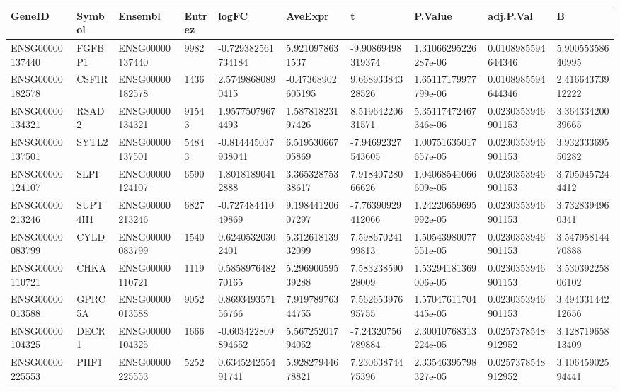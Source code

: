 \begingroup
\tiny
\setlength{\tabcolsep}{2pt}
\renewcommand{\arraystretch}{1.18}
\begin{tabular}{@{}llllllllll@{}}
\toprule
GeneID & Symbol & Ensembl & Entrez & logFC & AveExpr & t & P.Value & adj.P.Val & B \\
\midrule
ENSG00000137440 & FGFBP1 & ENSG00000137440 & 9982 & -0.729382561734184 & 5.9210978631537 & -9.90869498319374 & 1.31066295226287e-06 & 0.0108985594644346 & 5.90055358640995 \\
ENSG00000182578 & CSF1R & ENSG00000182578 & 1436 & 2.57498680890415 & -0.47368902605195 & 9.66893384328526 & 1.65117179977799e-06 & 0.0108985594644346 & 2.41664373912222 \\
ENSG00000134321 & RSAD2 & ENSG00000134321 & 91543 & 1.95775079674493 & 1.58781823197426 & 8.51964220631571 & 5.35117472467346e-06 & 0.0230353946901153 & 3.36433420039665 \\
ENSG00000137501 & SYTL2 & ENSG00000137501 & 54843 & -0.814445037938041 & 6.51953066705869 & -7.94692327543605 & 1.00751635017657e-05 & 0.0230353946901153 & 3.93233369550282 \\
ENSG00000124107 & SLPI & ENSG00000124107 & 6590 & 1.80181890412888 & 3.36532875338617 & 7.91840728066626 & 1.04068541066609e-05 & 0.0230353946901153 & 3.7050457244412 \\
ENSG00000213246 & SUPT4H1 & ENSG00000213246 & 6827 & -0.72748441049869 & 9.19844120607297 & -7.76390929412066 & 1.24220659695992e-05 & 0.0230353946901153 & 3.7328394960341 \\
ENSG00000083799 & CYLD & ENSG00000083799 & 1540 & 0.62405320302401 & 5.31261813932099 & 7.59867024199813 & 1.50543980077551e-05 & 0.0230353946901153 & 3.54795814470888 \\
ENSG00000110721 & CHKA & ENSG00000110721 & 1119 & 0.585897648270165 & 5.29690059539288 & 7.58323859028009 & 1.53294181369006e-05 & 0.0230353946901153 & 3.53039225806102 \\
ENSG00000013588 & GPRC5A & ENSG00000013588 & 9052 & 0.869349357156766 & 7.91978976344755 & 7.56265397695755 & 1.57047611704445e-05 & 0.0230353946901153 & 3.49433144212656 \\
ENSG00000104325 & DECR1 & ENSG00000104325 & 1666 & -0.603422809894652 & 5.56725201794052 & -7.24320756789884 & 2.30010768313224e-05 & 0.0257378548912952 & 3.12871965813409 \\
ENSG00000225553 & PHF1 & ENSG00000225553 & 5252 & 0.634524255491741 & 5.92827944678821 & 7.23063874475396 & 2.33546395798327e-05 & 0.0257378548912952 & 3.10645902594441 \\

\end{tabular}
